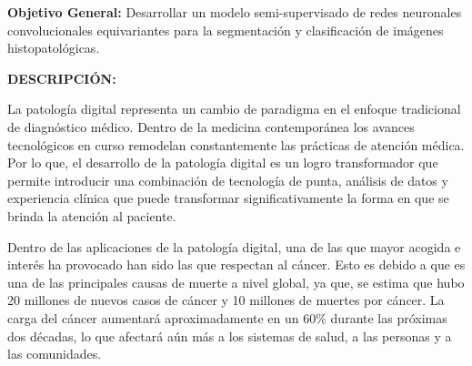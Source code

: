 \documentclass[12pt,letterpaper,final, openany]{scrbook}
\begin{document}
\textbf{Objetivo General:} Desarrollar un modelo semi-supervisado de redes neuronales convolucionales equivariantes para la segmentación y clasificación de imágenes histopatológicas.

\textbf{DESCRIPCIÓN:}


La patología digital representa un cambio de paradigma en el enfoque tradicional de diagnóstico médico. Dentro de la medicina contemporánea los avances tecnológicos en curso remodelan constantemente las prácticas de atención médica. Por lo que, el desarrollo de la patología digital es un logro transformador que permite introducir una combinación de tecnología de punta, análisis de datos y experiencia clínica que puede transformar significativamente la forma en que se brinda la atención al paciente.

Dentro de las aplicaciones de la patología digital, una de las que mayor acogida e interés ha provocado han sido las que respectan al cáncer. Esto es debido a que es una de las principales causas de muerte a nivel global, ya que, se estima que hubo 20 millones de nuevos casos de cáncer y 10 millones de muertes por cáncer. La carga del cáncer aumentará aproximadamente en un 60\% durante las próximas dos décadas, lo que afectará aún más a los sistemas de salud, a las personas y a las comunidades.
\end{document}
